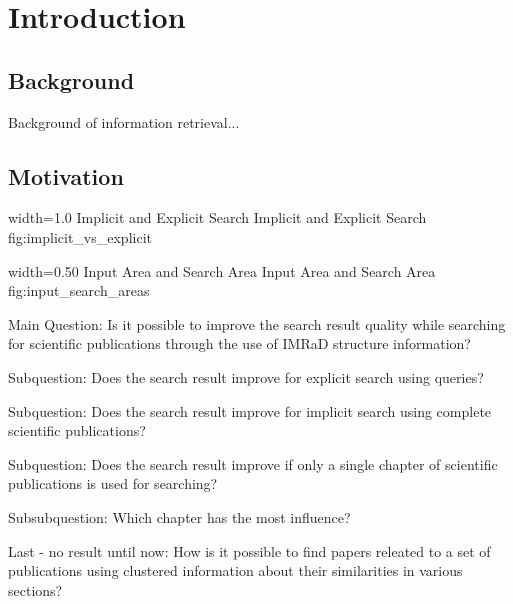 \chapter{Introduction}
\label{cha:introduction}

\section{Background}
\label{sec:background}

Background of information retrieval...

\section{Motivation}
\label{sec:Motivation}

      {width=1.0\textwidth}
      {Implicit and Explicit Search}
      {Implicit and Explicit Search}
      {fig:implicit_vs_explicit}

      {width=0.50\textwidth}
      {Input Area and Search Area}
      {Input Area and Search Area}
      {fig:input_search_areas}


Main Question: Is it possible to improve the search result quality while searching for scientific publications through the use of IMRaD structure information?

Subquestion: Does the search result improve for explicit search using queries?

Subquestion: Does the search result improve for implicit search using complete scientific publications?

Subquestion: Does the search result improve if only a single chapter of scientific publications is used for searching?

Subsubquestion: Which chapter has the most influence?

Last - no result until now: How is it possible to find papers releated to a set of publications using clustered information about their similarities in various sections?
